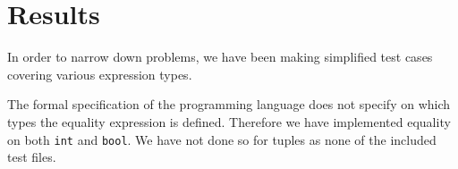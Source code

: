 \documentclass{article}
\begin{document}
\section{Results}

%


In order to narrow down problems, we have been making simplified test cases covering various expression types.


The formal specification of the programming language does not specify on which types the equality expression is defined. Therefore we have implemented equality on both {\tt int} and {\tt bool}. We have not done so for tuples as none of the included test files.
\end{document}
